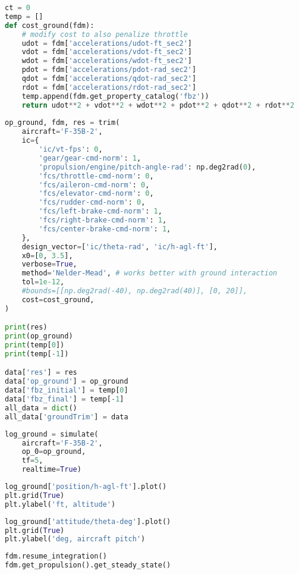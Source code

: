 \begin{lstlisting}[language=Python]
ct = 0
temp = []
def cost_ground(fdm):
    # modify cost to also penalize throttle   
    udot = fdm['accelerations/udot-ft_sec2']
    vdot = fdm['accelerations/vdot-ft_sec2']
    wdot = fdm['accelerations/wdot-ft_sec2']
    pdot = fdm['accelerations/pdot-rad_sec2']
    qdot = fdm['accelerations/qdot-rad_sec2']
    rdot = fdm['accelerations/rdot-rad_sec2']
    temp.append(fdm.get_property_catalog('fbz'))
    return udot**2 + vdot**2 + wdot**2 + pdot**2 + qdot**2 + rdot**2  
        
op_ground, fdm, res = trim(
    aircraft='F-35B-2',
    ic={
        'ic/vt-fps': 0,
        'gear/gear-cmd-norm': 1,
        'propulsion/engine/pitch-angle-rad': np.deg2rad(0),
        'fcs/throttle-cmd-norm': 0,
        'fcs/aileron-cmd-norm': 0,
        'fcs/elevator-cmd-norm': 0,
        'fcs/rudder-cmd-norm': 0,
        'fcs/left-brake-cmd-norm': 1,
        'fcs/right-brake-cmd-norm': 1,
        'fcs/center-brake-cmd-norm': 1,
    },
    design_vector=['ic/theta-rad', 'ic/h-agl-ft'],
    x0=[0, 3.5],
    verbose=True,
    method='Nelder-Mead', # works better with ground interaction
    tol=1e-12,
    #bounds=[[np.deg2rad(-40), np.deg2rad(40)], [0, 20]],
    cost=cost_ground,
)

print(res)
print(op_ground)
print(temp[0])
print(temp[-1])

data['res'] = res
data['op_ground'] = op_ground
data['fbz_initial'] = temp[0]
data['fbz_final'] = temp[-1]
all_data = dict()
all_data['groundTrim'] = data
\end{lstlisting}

\begin{lstlisting}[language=Python]
log_ground = simulate(
    aircraft='F-35B-2',
    op_0=op_ground,
    tf=5,
    realtime=True)
\end{lstlisting}

\begin{lstlisting}[language=Python]
log_ground['position/h-agl-ft'].plot()
plt.grid(True)
plt.ylabel('ft, altitude')
\end{lstlisting}

\begin{lstlisting}[language=Python]
log_ground['attitude/theta-deg'].plot()
plt.grid(True)
plt.ylabel('deg, aircraft pitch')
\end{lstlisting}

\begin{lstlisting}[language=Python]
fdm.resume_integration()
fdm.get_propulsion().get_steady_state()
\end{lstlisting}

